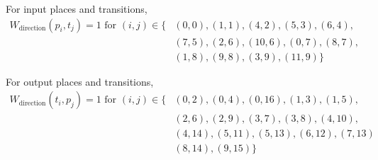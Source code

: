 \documentclass[12pt,a4paper]{article}
\begin{document}
For input places and transitions,
\begin{align*}
  W_{\text{direction}}(p_i, t_j) = 1 \text{ for } (i, j) \in 
\{&(0, 0), (1, 1), (4, 2), (5, 3), (6, 4), \\
  &(7, 5), (2, 6), (10, 6), (0, 7), (8, 7), \\
  &(1, 8), (9, 8), (3, 9), (11, 9)\}
\end{align*}

For output places and transitions,
\begin{align*}
  W_{\text{direction}}(t_i, p_j) = 1 \text{ for } (i, j) \in 
\{&(0, 2), (0, 4), (0, 16), (1, 3), (1, 5), \\
  &(2, 6), (2, 9), (3, 7), (3, 8), (4, 10), \\
  &(4, 14), (5, 11), (5, 13), (6, 12), (7, 13) \\
  &(8, 14), (9, 15) \}
\end{align*}
\end{document}
